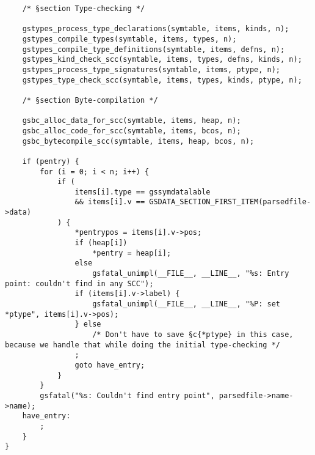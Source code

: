 \documentclass{report}
\begin{document}
\begin{verbatim}
    /* §section Type-checking */

    gstypes_process_type_declarations(symtable, items, kinds, n);
    gstypes_compile_types(symtable, items, types, n);
    gstypes_compile_type_definitions(symtable, items, defns, n);
    gstypes_kind_check_scc(symtable, items, types, defns, kinds, n);
    gstypes_process_type_signatures(symtable, items, ptype, n);
    gstypes_type_check_scc(symtable, items, types, kinds, ptype, n);

    /* §section Byte-compilation */

    gsbc_alloc_data_for_scc(symtable, items, heap, n);
    gsbc_alloc_code_for_scc(symtable, items, bcos, n);
    gsbc_bytecompile_scc(symtable, items, heap, bcos, n);

    if (pentry) {
        for (i = 0; i < n; i++) {
            if (
                items[i].type == gssymdatalable
                && items[i].v == GSDATA_SECTION_FIRST_ITEM(parsedfile->data)
            ) {
                *pentrypos = items[i].v->pos;
                if (heap[i])
                    *pentry = heap[i];
                else
                    gsfatal_unimpl(__FILE__, __LINE__, "%s: Entry point: couldn't find in any SCC");
                if (items[i].v->label) {
                    gsfatal_unimpl(__FILE__, __LINE__, "%P: set *ptype", items[i].v->pos);
                } else
                    /* Don't have to save §c{*ptype} in this case, because we handle that while doing the initial type-checking */
                ;
                goto have_entry;
            }
        }
        gsfatal("%s: Couldn't find entry point", parsedfile->name->name);
    have_entry:
        ;
    }
}
\end{verbatim}



\end{document}
